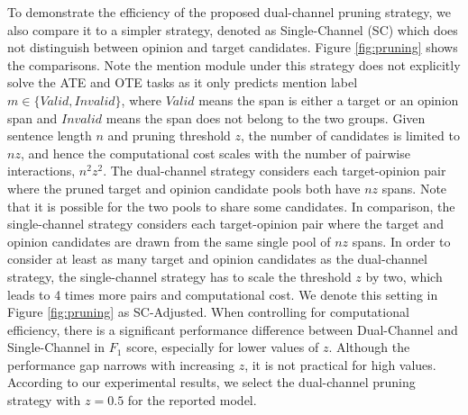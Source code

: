 \documentclass[11pt,a4paper]{article}
\begin{document}
To demonstrate the efficiency of the proposed dual-channel pruning strategy, we also compare it to a simpler strategy, denoted as Single-Channel (SC) which does not distinguish between opinion and target candidates.
Figure \ref{fig:pruning} shows the comparisons.
Note the mention module under this strategy does not explicitly solve the ATE and OTE tasks as it only predicts mention label $m \in \{Valid, Invalid\}$, where $Valid$ means the span is either a target or an opinion span and $Invalid$ means the span does not belong to the two groups.
Given sentence length $n$ and pruning threshold $z$, the number of candidates is limited to $nz$, and hence the computational cost scales with the number of pairwise interactions, $n^2 z^2$.
The dual-channel strategy considers each target-opinion pair where the pruned target and opinion candidate pools both have $nz$ spans. Note that it is possible for the two pools to share some candidates. 
In comparison, the single-channel strategy considers each target-opinion pair where the target and opinion candidates are drawn from the same single pool of $nz$ spans.
In order to consider at least as many target and opinion candidates as the dual-channel strategy, the single-channel strategy has to scale the threshold $z$ by two, which leads to 4 times more pairs and computational cost. 
We denote this setting in Figure \ref{fig:pruning} as SC-Adjusted.
When controlling for computational efficiency, there is a significant performance difference between Dual-Channel and Single-Channel in $F_1$ score, especially for lower values of $z$.
Although the performance gap narrows with increasing $z$, it is not practical for high values.
According to our experimental results, we select the dual-channel pruning strategy with $z=0.5$ for the reported model. 
\end{document}
